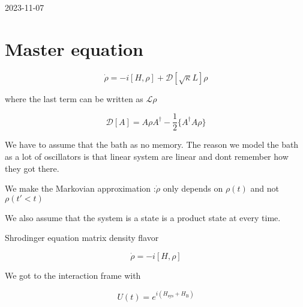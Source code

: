


2023-11-07

\section{Master equation}

\[ \dot \rho = -i [H, \rho] + \mathcal{D}[\sqrt{\kappa}L]\rho \]

where the last term can be written as $\mathscr{L}\rho$

\[ \mathcal{D}[A] = A\rho A^{\dagger} - \frac{1}{2} \{ A^{\dagger}A\rho  \}  \]

We have to assume that the bath as no memory. The reason we model the bath as a lot of oscillators is that linear system are linear and dont remember how they got there.

We make the Markovian approximation :$\dot \rho$ only depends on $\rho(t)$ and not $\rho(t'<t)$

We also assume that the system is a state is a product state at every time.


Shrodinger equation matrix density flavor


\[ \dot \rho = -i [H, \rho]  \]

We got to the interaction frame with 

\[ U(t) = e^{i(H_{\text{sys}} + H_{\text{B}} )} \]




